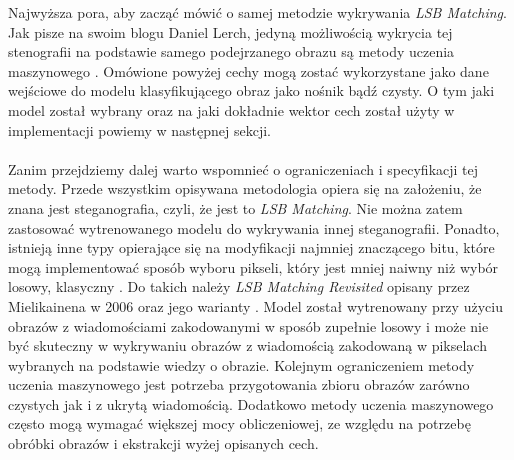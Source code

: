 \documentclass[a4paper,12pt]{article}
\begin{document}
        
        Najwyższa pora, aby zacząć mówić o samej metodzie wykrywania \textit{LSB Matching}. Jak pisze na swoim blogu Daniel Lerch, jedyną możliwością wykrycia tej stenografii na podstawie samego podejrzanego obrazu są metody uczenia maszynowego \cite{daniel}. Omówione powyżej cechy mogą zostać wykorzystane jako dane wejściowe do modelu klasyfikującego obraz jako nośnik bądź czysty. O tym jaki model został wybrany oraz na jaki dokładnie wektor cech został użyty w implementacji powiemy w następnej sekcji. \\
        \\
        Zanim przejdziemy dalej warto wspomnieć o ograniczeniach i specyfikacji tej metody. Przede wszystkim opisywana metodologia opiera się na założeniu, że znana jest steganografia, czyli, że jest to \textit{LSB Matching}. Nie można zatem zastosować wytrenowanego modelu do wykrywania innej steganografii. Ponadto, istnieją inne typy opierające się na modyfikacji najmniej znaczącego bitu, które mogą implementować sposób wyboru pikseli, który jest mniej naiwny niż wybór losowy, klasyczny \cite{kombrink}. Do takich należy \textit{LSB Matching Revisited} opisany przez Mielikainena w 2006 oraz jego warianty \cite{LSBR, LSBRR}. Model został wytrenowany przy użyciu obrazów z wiadomościami zakodowanymi w sposób zupełnie losowy i może nie być skuteczny w wykrywaniu obrazów z wiadomością zakodowaną w pikselach wybranych na podstawie wiedzy o obrazie. Kolejnym ograniczeniem metody uczenia maszynowego jest potrzeba przygotowania zbioru obrazów zarówno czystych jak i z ukrytą wiadomością. Dodatkowo metody uczenia maszynowego często mogą wymagać większej mocy obliczeniowej, ze względu na potrzebę obróbki obrazów i ekstrakcji wyżej opisanych cech.
\end{document}
